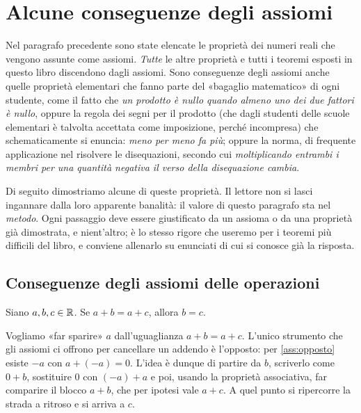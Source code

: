 \section{Alcune conseguenze degli assiomi}
\label{sec:conseguenze}

Nel paragrafo precedente sono state elencate le proprietà dei numeri reali che vengono
assunte come assiomi. \emph{Tutte} le altre proprietà e tutti i teoremi esposti in
questo libro discendono dagli assiomi. Sono conseguenze degli assiomi anche quelle
proprietà elementari che fanno parte del «bagaglio matematico» di ogni studente, come il
fatto che \emph{un prodotto è nullo quando almeno uno dei due fattori è nullo}, oppure la
regola dei segni per il prodotto (che dagli studenti delle scuole elementari è talvolta
accettata come imposizione, perché incompresa) che schematicamente si enuncia:
\emph{meno per meno fa più}; oppure la norma, di frequente applicazione nel risolvere le
disequazioni, secondo cui \emph{moltiplicando entrambi i membri per una quantità
negativa il verso della disequazione cambia}.

Di seguito dimostriamo alcune di queste proprietà. Il lettore non si lasci ingannare
dalla loro apparente banalità: il valore di questo paragrafo sta nel \emph{metodo}. Ogni
passaggio deve essere giustificato da un assioma o da una proprietà già dimostrata, e
nient'altro; è lo stesso rigore che useremo per i teoremi più difficili del libro, e
conviene allenarlo su enunciati di cui si conosce già la risposta.

\subsection{Conseguenze degli assiomi delle operazioni}

\begin{proposizione}\label{prop:semplificazione-somma}
Siano $a,b,c\in\mathbb{R}$. Se $a+b=a+c$, allora $b=c$.
\end{proposizione}

\begin{schema}
\end{schema}

\begin{strategia}
Vogliamo «far sparire» $a$ dall'uguaglianza $a+b=a+c$. L'unico strumento che gli assiomi
ci offrono per cancellare un addendo è l'opposto: per \ref{ass:opposto} esiste $-a$ con
$a+(-a)=0$. L'idea è dunque di partire da $b$, scriverlo come $0+b$, sostituire $0$ con
$(-a)+a$ e poi, usando la proprietà associativa, far comparire il blocco $a+b$, che per
ipotesi vale $a+c$. A quel punto si ripercorre la strada a ritroso e si arriva a $c$.
\end{strategia}

